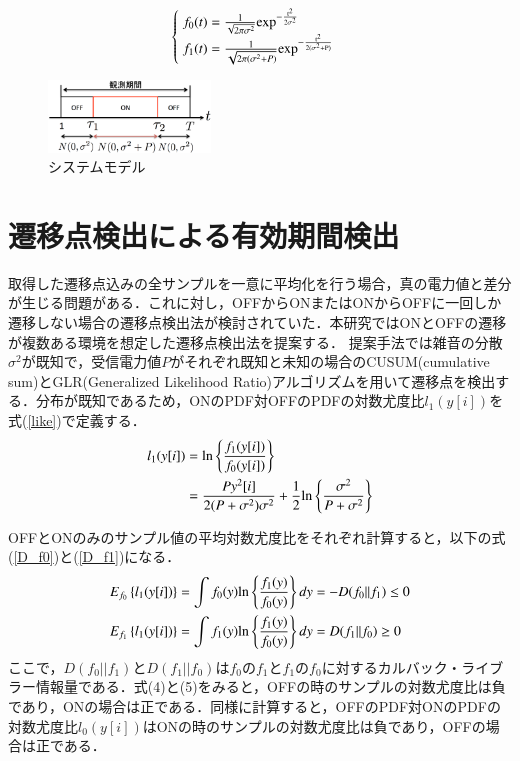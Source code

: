 \documentclass[10pt, twocolumn, a4j]{jsarticle}
\begin{document}
\begin{align}
\begin{cases}
\;f_0(t) = \frac{1}{\sqrt{2\pi\sigma^2}} \rm{exp}^{-\frac{t^2}{2\sigma^2}} \\
\;f_1(t) = \frac{1}{\sqrt{2\pi(\sigma^2+P)}} \rm{exp}^{-\frac{t^2}{2(\sigma^2+P)}}
\end{cases}
\label{normal}
\end{align}

\begin{figure}[t]
\centering
\includegraphics[clip,width=43mm]{systemodel.eps}
\caption{システムモデル}
\label{Systemmodel}
\end{figure}

\section{遷移点検出による有効期間検出}
取得した遷移点込みの全サンプルを一意に平均化を行う場合，真の電力値と差分が生じる問題がある．これに対し，OFFからONまたはONからOFFに一回しか遷移しない場合の遷移点検出法が検討されていた\cite{Quickest_detection}．本研究ではONとOFFの遷移が複数ある環境を想定した遷移点検出法を提案する．
提案手法では雑音の分散$\sigma^2$が既知で，受信電力値$P$がそれぞれ既知と未知の場合のCUSUM(cumulative sum)とGLR(Generalized Likelihood Ratio)アルゴリズムを用いて遷移点を検出する．分布が既知であるため，ONのPDF対OFFのPDFの対数尤度比$l_{1}(y[i])$を式(\ref{like})で定義する．
\begin{align}
l_{1}(y[i]) &= {\rm ln}\left\{\frac{f_1(y[i])}{f_0(y[i])}\right\} \label{like} \\
&=\frac{Py^2[i]}{2(P+\sigma^2)\sigma^2} + \frac{1}{2}{\rm ln}\left\{\frac{\sigma^2}{P+\sigma^2}\right\} \nonumber
\end{align}

OFFとONのみのサンプル値の平均対数尤度比をそれぞれ計算すると，以下の式(\ref{D_f0})と(\ref{D_f1})になる．
\begin{eqnarray}
E_{f_0}\left\{l_1(y[i])\right\} &=\int f_0(y){\rm ln}\left\{\frac{f_1(y)}{f_0(y)}\right\}dy=-D(f_0||f_1)\leq 0 \label{D_f0} \\
E_{f_1}\left\{l_1(y[i])\right\} &=\int f_1(y){\rm ln}\left\{\frac{f_1(y)}{f_0(y)}\right\}dy=D(f_1||f_0)\geq 0 \label{D_f1}
\end{eqnarray}
ここで，$D(f_0||f_1)$と$D(f_1||f_0)$は$f_0$の$f_1$と$f_1$の$f_0$に対するカルバック・ライブラー情報量である．式(4)と(5)をみると，OFFの時のサンプルの対数尤度比は負であり，ONの場合は正である．同様に計算すると，OFFのPDF対ONのPDFの対数尤度比$l_{0}(y[i])$はONの時のサンプルの対数尤度比は負であり，OFFの場合は正である．
\end{document}
